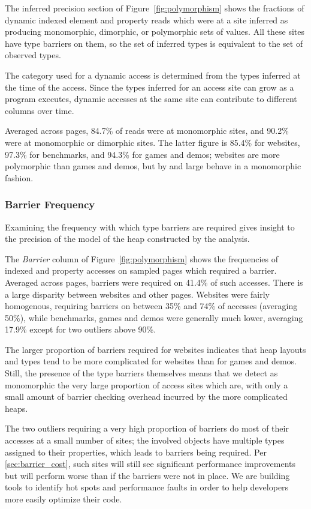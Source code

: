 The inferred precision section of Figure~\ref{fig:polymorphism} shows the fractions
of dynamic indexed element and property reads which were at a site inferred
as producing
monomorphic, dimorphic, or polymorphic sets of values.
All these sites have type barriers on them, so the set of inferred types
is equivalent to the set of observed types.

The category used for a dynamic access is determined from the types
inferred at the time of the access.
Since the types inferred for an access site can grow as a program executes,
dynamic accesses at the same site can contribute to different
columns over time.

Averaged across pages, 84.7\% of reads were at monomorphic
sites, and 90.2\% were at monomorphic or dimorphic sites.
The latter figure is 85.4\% for websites, 97.3\% for benchmarks,
and 94.3\% for games and demos; websites are more polymorphic than games
and demos, but by and large behave in a monomorphic fashion.

\subsubsection{Barrier Frequency}
\label{sec:barriers}

Examining the frequency with which type barriers are required
gives insight to the precision of the model of the heap constructed by
the analysis.

The {\it Barrier} column of Figure~\ref{fig:polymorphism} shows the frequencies of
indexed and property accesses on sampled pages which required a barrier.
Averaged across pages, barriers were required on 41.4\% of such accesses.
There is a large disparity between websites and other pages.
Websites were fairly homogenous, requiring barriers on between 35\%
and 74\% of accesses (averaging 50\%), while benchmarks,
games and demos were generally
much lower, averaging 17.9\% except for two outliers above 90\%.

The larger proportion of barriers required for websites indicates that
heap layouts and types tend to be more complicated for websites than for
games and demos.
Still, the presence of the type barriers themselves means that we
detect as monomorphic the very large proportion of access sites which are,
with only a small amount of barrier checking overhead incurred by the
more complicated heaps.

The two outliers requiring a very high proportion of barriers do most of
their accesses at a small number of sites; the involved objects have
multiple types assigned to their properties, which leads to barriers being
required.
Per \Section\ref{sec:barrier_cost}, such sites will still see significant
performance improvements but will perform worse than if the barriers were
not in place.
We are building tools to identify hot spots and performance
faults in order to help developers more easily optimize their code.

